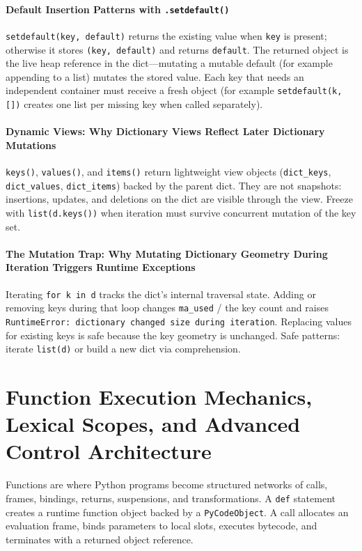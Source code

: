 \documentclass[a4paper,twoside]{report}
\begin{document}
\subsubsection{Default Insertion Patterns with \texttt{.setdefault()}}

\texttt{setdefault(key, default)} returns the existing value when \texttt{key} is present; otherwise it stores \texttt{(key, default)} and returns \texttt{default}. The returned object is the live heap reference in the dict---mutating a mutable default (for example appending to a list) mutates the stored value. Each key that needs an independent container must receive a fresh object (for example \texttt{setdefault(k, [])} creates one list per missing key when called separately).

\subsubsection{Dynamic Views: Why Dictionary Views Reflect Later Dictionary Mutations}

\texttt{keys()}, \texttt{values()}, and \texttt{items()} return lightweight view objects (\texttt{dict\_keys}, \texttt{dict\_values}, \texttt{dict\_items}) backed by the parent dict. They are not snapshots: insertions, updates, and deletions on the dict are visible through the view. Freeze with \texttt{list(d.keys())} when iteration must survive concurrent mutation of the key set.

\subsubsection{The Mutation Trap: Why Mutating Dictionary Geometry During Iteration Triggers Runtime Exceptions}

Iterating \texttt{for k in d} tracks the dict's internal traversal state. Adding or removing keys during that loop changes \texttt{ma\_used} / the key count and raises \texttt{RuntimeError: dictionary changed size during iteration}. Replacing values for existing keys is safe because the key geometry is unchanged. Safe patterns: iterate \texttt{list(d)} or build a new dict via comprehension.


\chapter{Function Execution Mechanics, Lexical Scopes, and Advanced Control Architecture}

Functions are where Python programs become structured networks of calls, frames, bindings, returns, suspensions, and transformations. A \texttt{def} statement creates a runtime function object backed by a \texttt{PyCodeObject}. A call allocates an evaluation frame, binds parameters to local slots, executes bytecode, and terminates with a returned object reference.
\end{document}
